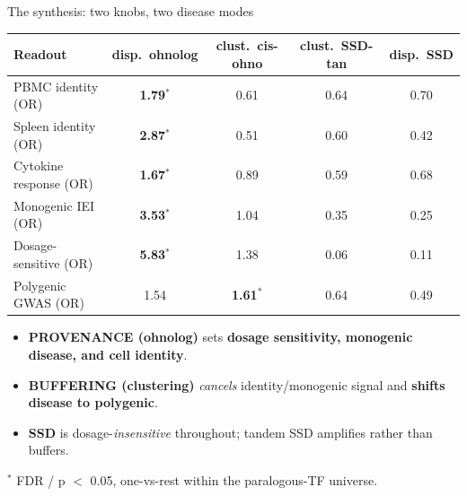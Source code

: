 \documentclass[aspectratio=169,11pt]{beamer}
\newcommand{\cat}[2]{\textcolor{#1}{\textbf{#2}}}
\begin{document}
\begin{frame}{The synthesis: two knobs, two disease modes}
\small
\begin{center}
\setlength{\tabcolsep}{7pt}\renewcommand{\arraystretch}{1.25}
\begin{tabular}{lcccc}
\toprule
\textbf{Readout} & \cat{ohnolog}{disp.\ ohnolog} & \cat{cisohno}{clust.\ cis-ohno} & \cat{ssdtan}{clust.\ SSD-tan} & \cat{dispssd}{disp.\ SSD} \\
\midrule
PBMC identity (OR)      & \textbf{1.79}$^\ast$ & 0.61 & 0.64 & 0.70 \\
Spleen identity (OR)    & \textbf{2.87}$^\ast$ & 0.51 & 0.60 & 0.42 \\
Cytokine response (OR)  & \textbf{1.67}$^\ast$ & 0.89 & 0.59 & 0.68 \\
Monogenic IEI (OR)      & \textbf{3.53}$^\ast$ & 1.04 & 0.35 & 0.25 \\
Dosage-sensitive (OR)   & \textbf{5.83}$^\ast$ & 1.38 & 0.06 & 0.11 \\
Polygenic GWAS (OR)     & 1.54 & \textbf{1.61}$^\ast$ & 0.64 & 0.49 \\
\bottomrule
\end{tabular}
\end{center}
\vspace{0.4em}
\begin{itemize}
  \item \cat{ohnolog}{PROVENANCE (ohnolog)} sets \textbf{dosage sensitivity, monogenic disease, and cell identity}.
  \item \cat{cisohno}{BUFFERING (clustering)} \emph{cancels} identity/monogenic signal and \textbf{shifts disease to polygenic}.
  \item \cat{ssdtan}{SSD} is dosage-\emph{insensitive} throughout; tandem SSD amplifies rather than buffers.
\end{itemize}
\centering\footnotesize $^\ast$ FDR / p $<$ 0.05, one-vs-rest within the paralogous-TF universe.
\end{frame}
\end{document}
